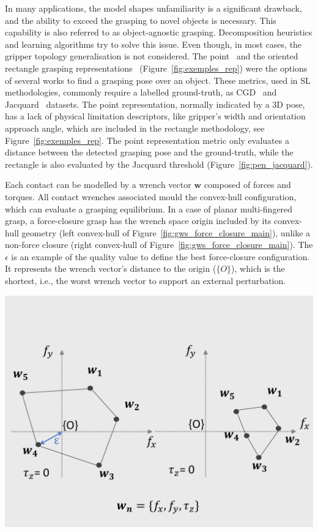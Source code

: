 In many applications,  the model shapes unfamiliarity is a significant drawback, and the ability to exceed the grasping to novel objects is necessary. This capability is also referred to as object-agnostic grasping. Decomposition heuristics and learning algorithms try to solve this issue. Even though, in most cases, the gripper topology generalisation is not considered. The point~\cite{Saxena2008} and the oriented rectangle grasping representations~\cite{Jiang2011a} (Figure~\ref{fig:exemples_rep}) were the options of several works to find a grasping pose over an object. These metrics, used in \ac{SL} methodologies, commonly require a labelled ground-truth, as \ac{CGD}~\cite{conerll_database} and Jacquard~\cite{jacquard_dataset} datasets. The point representation, normally indicated by a 3D pose, has a lack of physical limitation descriptors, like gripper's width and orientation approach angle, which are included in the rectangle methodology, see Figure~\ref{fig:exemples_rep}. The point representation metric only evaluates a distance between the detected grasping pose and the ground-truth, while the rectangle is also evaluated by the Jacquard threshold (Figure~\ref{fig:pen_jacquard}).


\begin{tcolorbox}[every float=\centering, drop shadow, title= Wrench Space Analyses]
Each contact can be modelled by a wrench vector $\mathbf{w}$ composed of forces and torques. All contact wrenches associated mould the convex-hull configuration, which can evaluate a grasping equilibrium. In a case of planar multi-fingered grasp, a force-closure grasp has the wrench space origin included by its convex-hull geometry (left convex-hull of Figure~\ref{fig:gws_force_closure_main}), unlike a non-force closure (right convex-hull of Figure~\ref{fig:gws_force_closure_main}). The $\epsilon$ is an example of the quality value to define the best force-closure configuration. It represents the wrench vector's distance to the origin ($\{O\}$), which is the shortest, i.e., the worst wrench vector to support an external perturbation.

\vspace*{1ex}

\centerline{\includegraphics[trim={0cm 1.2cm 0cm 5.5cm},clip,width=0.65\linewidth,angle=0]{Cap2/Figuras/wrenchspace_anlayses_2.pdf}}
\label{fig:gws_force_closure_main}
\end{tcolorbox}

